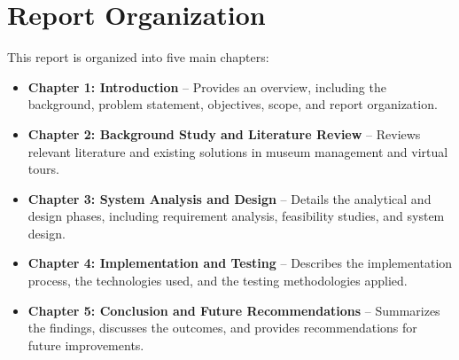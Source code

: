 \section{Report Organization}
This report is organized into five main chapters:
\begin{itemize}
  \item \textbf{Chapter 1: Introduction} – Provides an overview, including the background, problem statement, objectives, scope, and report organization.
  \item \textbf{Chapter 2: Background Study and Literature Review} – Reviews relevant literature and existing solutions in museum management and virtual tours.
  \item \textbf{Chapter 3: System Analysis and Design} – Details the analytical and design phases, including requirement analysis, feasibility studies, and system design.
  \item \textbf{Chapter 4: Implementation and Testing} – Describes the implementation process, the technologies used, and the testing methodologies applied.
  \item \textbf{Chapter 5: Conclusion and Future Recommendations} – Summarizes the findings, discusses the outcomes, and provides recommendations for future improvements.
\end{itemize}

\newpage
